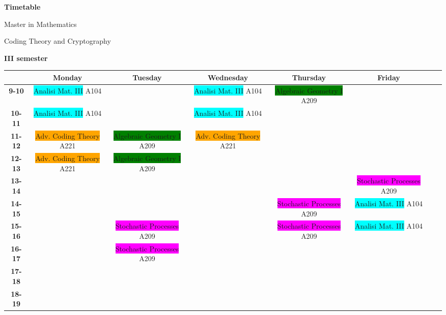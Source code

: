 \documentclass{article}
\newcommand{\bluelight}[1]{\colorbox{cyan}{#1}}
\newcommand{\orangelight}[1]{\colorbox{orange}{#1}}
\newcommand{\greenlight}[1]{\colorbox{green}{#1}}
\newcommand{\redlight}[1]{\colorbox{magenta}{#1}}
\begin{document}
\begin{landscape}

\begin{center}
\begin{huge}
	\textbf{Timetable}\\
\end{huge}
\bigskip
\begin{Large}
Master in Mathematics \\
\end{Large}
\begin{large}
Coding Theory and Cryptography\\

\end{large}
\end{center}


\begin{center}
\textbf{III semester}
\end{center}

\begin{table}[ht]
\centering
\begin{tabular}{|c|c|c|c|c|c|c|c|}\hline
& \textbf{Monday} & \textbf{Tuesday} & \textbf{Wednesday} & \textbf{Thursday} & \textbf{Friday}\\ \hline
\textbf{9-10} & \bluelight{Analisi Mat. III} A104 & & \bluelight{Analisi Mat. III} A104 & \greenlight{Algebraic Geometry I} A209 & \\ \hline
\textbf{10-11} & \bluelight{Analisi Mat. III} A104 & & \bluelight{Analisi Mat. III} A104 &  & \\ \hline
\textbf{11-12} & \orangelight{Adv. Coding Theory} A221 & \greenlight{Algebraic Geometry I} A209 & \orangelight{Adv. Coding Theory} A221& & \\ \hline
\textbf{12-13} & \orangelight{Adv. Coding Theory} A221 & \greenlight{Algebraic Geometry I} A209 & &  & \\ \hline
\textbf{13-14} & & & & & \redlight{Stochastic Processes} A209 \\ \hline
\textbf{14-15} &   & &  & \redlight{Stochastic Processes} A209 & \bluelight{Analisi Mat. III} A104 \\ \hline
\textbf{15-16} &   & \redlight{Stochastic Processes} A209 &  & \redlight{Stochastic Processes} A209 & \bluelight{Analisi Mat. III} A104 \\ \hline
\textbf{16-17} &   & \redlight{Stochastic Processes} A209 &  & & \\ \hline
\textbf{17-18} &   &  & & & \\ \hline
\textbf{18-19} &   & &  & & \\ \hline
\end{tabular}
\end{table}

\end{landscape}
\end{document}
